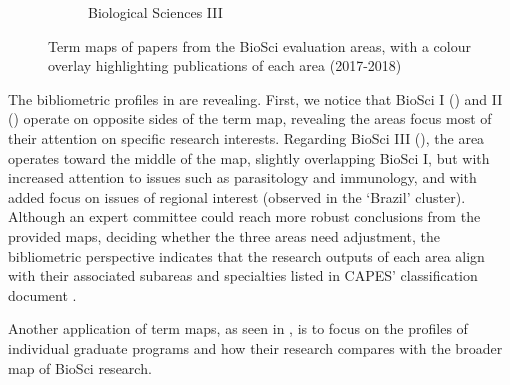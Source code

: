 \begin{figure}[H]
\begin{subfigure}[t]{1\textwidth}
    \vspace{-20em}\caption{Biological Sciences III}
  \end{subfigure}
    \caption{Term maps of papers from the BioSci evaluation areas, with a colour overlay highlighting publications of each area (2017-2018)}
    \label{fig:classif:vosviewer_cb_all}
\end{figure}
 
The bibliometric profiles in  are revealing. First, we notice that BioSci I () and II () operate on opposite sides of the term map, revealing the areas focus most of their attention on specific research interests. Regarding BioSci III (), the area operates toward the middle of the map, slightly overlapping BioSci I, but with increased attention to issues such as parasitology and immunology, and with added focus on issues of regional interest (observed in the ‘Brazil’ cluster). Although an expert committee could reach more robust conclusions from the provided maps, deciding whether the three areas need adjustment, the bibliometric perspective indicates that the research outputs of each area align with their associated subareas and specialties listed in CAPES’ classification document \autocite*{CAPES.2020tb}.

Another application of term maps, as seen in , is to focus on the profiles of individual graduate programs and how their research compares with the broader map of BioSci research. 

